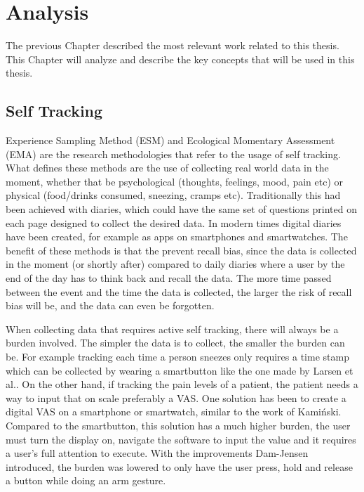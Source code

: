 \chapter{Analysis}\label{anal_ch}
The previous Chapter described the most relevant work related to this thesis. This Chapter will analyze and describe the key concepts that will be used in this thesis.


\section{Self Tracking}
Experience Sampling Method (ESM) and Ecological Momentary Assessment (EMA) are the research methodologies that refer to the usage of self tracking\cite{esm}. What defines these methods are the use of collecting real world data in the moment, whether that be psychological (thoughts, feelings, mood, pain etc) or physical (food/drinks consumed, sneezing, cramps etc). Traditionally this had been achieved with diaries, which could have the same set of questions printed on each page designed to collect the desired data. In modern times digital diaries have been created, for example as apps on smartphones and smartwatches. The benefit of these methods is that the prevent recall bias, since the data is collected in the moment (or shortly after) compared to daily diaries where a user by the end of the day has to think back and recall the data. The more time passed between the event and the time the data is collected, the larger the risk of recall bias will be, and the data can even be forgotten.

When collecting data that requires active self tracking, there will always be a burden involved. The simpler the data is to collect, the smaller the burden can be. For example tracking each time a person sneezes only requires a time stamp which can be collected by wearing a smartbutton like the one made by Larsen et al.\cite{eg}. On the other hand, if tracking the pain levels of a patient, the patient needs a way to input that on scale preferably a VAS. One solution has been to create a digital VAS on a smartphone or smartwatch, similar to the work of Kami\'nski\cite{tomas}. Compared to the smartbutton, this solution has a much higher burden, the user must turn the display on, navigate the software to input the value and it requires a user's full attention to execute. With the improvements Dam-Jensen\cite{dam} introduced, the burden was lowered to only have the user press, hold and release a button while doing an arm gesture.


